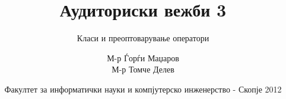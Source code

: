 

\author[АВ3]{М-р Ѓорѓи Маџаров\\М-р Томче Делев}
\title[Објектно ориентирано програмирање]{Аудиториски вежби 3}
\subtitle{Класи и преоптоварување оператори}
\date{Факултет за информатички науки и компјутерско инженерство - Скопје 2012}





\frame[t,plain]{\titlepage}











